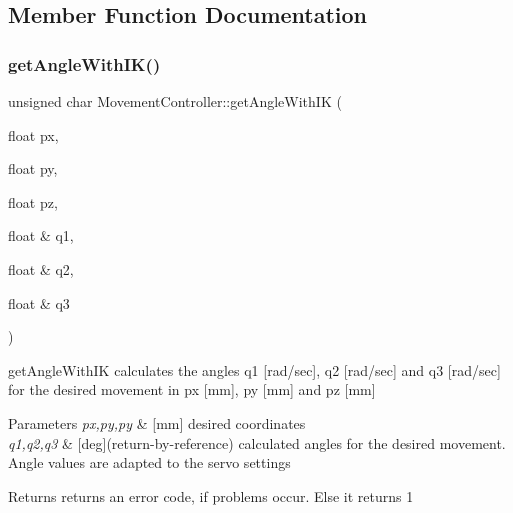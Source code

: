 \subsection{Member Function Documentation}
\mbox{\label{class_movement_controller_a53d19d2516a2ed440c2b15fc47ea91b7}} 
\subsubsection{\texorpdfstring{get\+Angle\+With\+I\+K()}{getAngleWithIK()}}
{\footnotesize\ttfamily unsigned char Movement\+Controller\+::get\+Angle\+With\+IK (\begin{DoxyParamCaption}\item[{float}]{px,  }\item[{float}]{py,  }\item[{float}]{pz,  }\item[{float \&}]{q1,  }\item[{float \&}]{q2,  }\item[{float \&}]{q3 }\end{DoxyParamCaption})}

get\+Angle\+With\+IK  calculates the angles q1 \mbox{[}rad/sec\mbox{]}, q2 \mbox{[}rad/sec\mbox{]} and q3 \mbox{[}rad/sec\mbox{]} for the desired movement in px \mbox{[}mm\mbox{]}, py \mbox{[}mm\mbox{]} and pz \mbox{[}mm\mbox{]} 
\begin{DoxyParams}{Parameters}
{\em px,py,py} & \mbox{[}mm\mbox{]} desired coordinates \\
\hline
{\em q1,q2,q3} & \mbox{[}deg\mbox{]}(return-\/by-\/reference) calculated angles for the desired movement. Angle values are adapted to the servo settings \\
\hline
\end{DoxyParams}
\begin{DoxyReturn}{Returns}
returns an error code, if problems occur. Else it returns 1 
\end{DoxyReturn}
\mbox{\label{class_movement_controller_a5765726eb4e820a7ac669c88fe4937e7}} 

